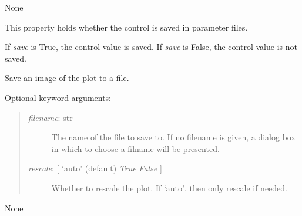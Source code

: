 \documentclass[letterpaper,10pt,english]{sphinxmanual}
\begin{document}
\begin{fulllineitems}

\begin{fulllineitems}
\label{api:mpl.Plot2D.resize_action}
None

\end{fulllineitems}


\begin{fulllineitems}
\label{api:mpl.Plot2D.save}
This property holds whether the control is saved in parameter files.

If \emph{save} is True, the control value is saved.
If \emph{save} is False, the control value is not saved.

\end{fulllineitems}


\begin{fulllineitems}
\label{api:mpl.Plot2D.save_figure}
Save an image of the plot to a file.

Optional keyword arguments:
\begin{quote}
\begin{description}
\item[{\emph{filename}: str}] \leavevmode
The name of the file to save to. If no filename is given, a dialog
box in which to choose a filname will be presented.

\item[{\emph{rescale}: {[} `auto' (default) \textbar{} \emph{True} \textbar{} \emph{False} {]}}] \leavevmode
Whether to rescale the plot. If `auto', then only rescale if needed.

\end{description}
\end{quote}

\end{fulllineitems}


\begin{fulllineitems}
\label{api:mpl.Plot2D.scroll_action}
None

\end{fulllineitems}



\end{fulllineitems}
\end{document}
